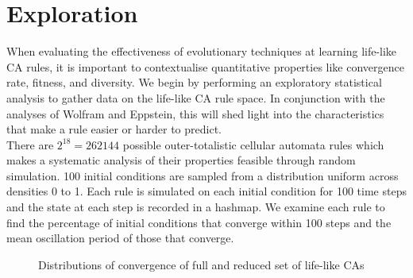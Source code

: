 \section{Exploration}

When evaluating the effectiveness of evolutionary techniques at learning life-like CA rules, it is important to contextualise quantitative properties like convergence rate, fitness, and diversity. We begin by performing an exploratory statistical analysis to gather data on the life-like CA rule space. In conjunction with the analyses of Wolfram\cite{wolfram1986theory} and Eppstein\cite{eppstein2010growth}, this will shed light into the characteristics that make a rule easier or harder to predict.\\

There are $2^{18} = 262144$ possible outer-totalistic cellular automata rules which makes a systematic analysis of their properties feasible through random simulation. 100 initial conditions are sampled from a distribution uniform across densities 0 to 1. Each rule is simulated on each initial condition for 100 time steps and the state at each step is recorded in a hashmap. We examine each rule to find the percentage of initial conditions that converge within 100 steps and the mean oscillation period of those that converge.\\   


\begin{figure}[!h]
\centering
            \hfill
            \hfill
            \caption{Distributions of convergence of full and reduced set of life-like CAs}
\label{fig:taxonomy-dist}
\end{figure}

